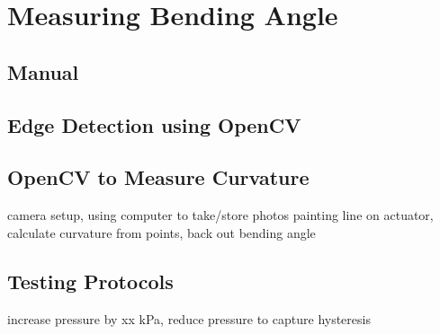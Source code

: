 \chapter{Measuring Bending Angle}
\section{Manual}
\section{Edge Detection using OpenCV}
\section{OpenCV to Measure Curvature}
camera setup, using computer to take/store photos painting line on actuator,
calculate curvature from points, back out bending angle
\section{Testing Protocols}
increase pressure by xx kPa, reduce pressure to capture hysteresis
